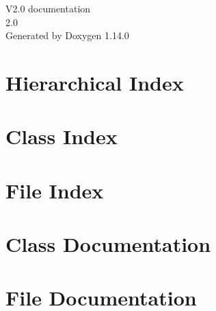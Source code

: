 \documentclass[twoside]{book}
\newcommand{\+}{\discretionary{\mbox{\scriptsize$\hookleftarrow$}}{}{}}
\newcommand{\clearemptydoublepage}{%
    \newpage{\pagestyle{empty}\cleardoublepage}%
  }
\begin{document}
  \raggedbottom
    \hypersetup{pageanchor=false,
                bookmarksnumbered=true,
                pdfencoding=unicode
               }
  \begin{titlepage}
  \vspace*{7cm}
  \begin{center}%
  {\Large V2.\+0 documentation}\\
  [1ex]\large 2.\+0 \\
  \vspace*{1cm}
  {\large Generated by Doxygen 1.14.0}\\
  \end{center}
  \end{titlepage}
  \clearemptydoublepage
  \tableofcontents
  \clearemptydoublepage
  \hypersetup{pageanchor=true}
\chapter{Hierarchical Index}

\chapter{Class Index}

\chapter{File Index}

\chapter{Class Documentation}


\chapter{File Documentation}





  \backmatter
  \newpage
  \clearemptydoublepage
  \printindex
\end{document}
